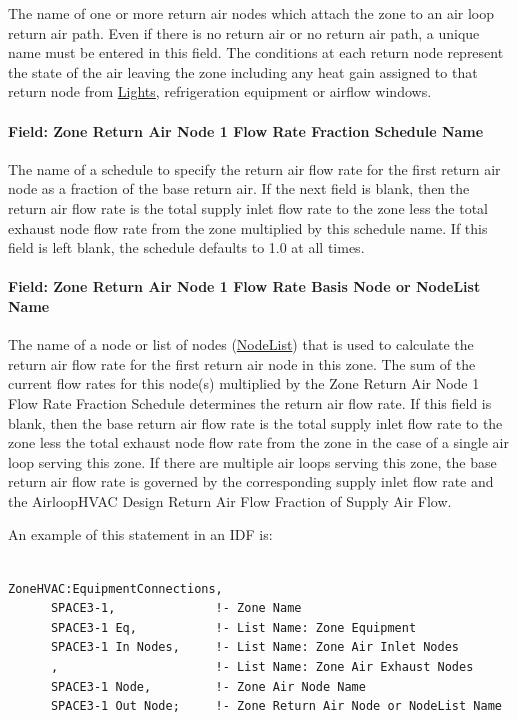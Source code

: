 The name of one or more return air nodes which attach the zone to an air loop return air path. Even if there is no return air or no return air path, a unique name must be entered in this field. The conditions at each return node represent the state of the air leaving the zone including any heat gain assigned to that return node from \hyperref[lights-000]{Lights}, refrigeration equipment or airflow windows.

\paragraph{Field: Zone Return Air Node 1 Flow Rate Fraction Schedule Name}\label{field-zone-return-air-flow-rate-fraction-schedule-name}

The name of a schedule to specify the return air flow rate for the first return air node as a fraction of the base return air. If the next field is blank, then the return air flow rate is the total supply inlet flow rate to the zone less the total exhaust node flow rate from the zone multiplied by this schedule name. If this field is left blank, the schedule defaults to 1.0 at all times.

\paragraph{Field: Zone Return Air Node 1 Flow Rate Basis Node or NodeList Name}\label{field-zone-return-air-flow-rate-basis-node-or-nodelist-name}

The name of a node or list of nodes (\hyperref[nodelist]{NodeList}) that is used to calculate the return air flow rate for the first return air node in this zone. The sum of the current flow rates for this node(s) multiplied by the Zone Return Air Node 1 Flow Rate Fraction Schedule determines the return air flow rate. If this field is blank, then the base return air flow rate is the total supply inlet flow rate to the zone less the total exhaust node flow rate from the zone in the case of a single air loop serving this zone. If there are multiple air loops serving this zone, the base return air flow rate is governed by the corresponding supply inlet flow rate and the AirloopHVAC Design Return Air Flow Fraction of Supply Air Flow.

An example of this statement in an IDF is:

\begin{lstlisting}

ZoneHVAC:EquipmentConnections,
      SPACE3-1,              !- Zone Name
      SPACE3-1 Eq,           !- List Name: Zone Equipment
      SPACE3-1 In Nodes,     !- List Name: Zone Air Inlet Nodes
      ,                      !- List Name: Zone Air Exhaust Nodes
      SPACE3-1 Node,         !- Zone Air Node Name
      SPACE3-1 Out Node;     !- Zone Return Air Node or NodeList Name
\end{lstlisting}

